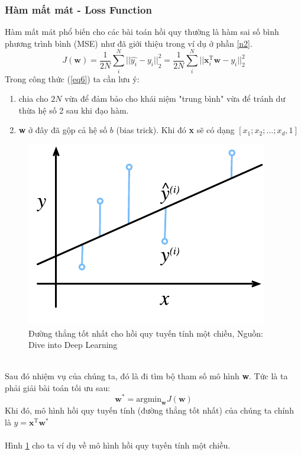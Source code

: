 \documentclass{article}
\begin{document}
\subsubsection*{Hàm mất mát - Loss Function}
Hàm mất mát phổ biến cho các bài toán hồi quy thường là hàm sai số bình phương trình bình (MSE) như đã giới thiệu trong ví dụ ở phần \ref{n2}.
\begin{equation}
    J(\textbf{w}) = \frac{1}{2N}\sum_{i}^{N}{||\hat{y_i}-y_i||}_{2}^{2}=\frac{1}{2N}\sum_{i}^{N}{||\textbf{x}_{i}^{\text{T}}\textbf{w}-y_i||_{2}^{2}}
    \label{eq6}
\end{equation}
Trong công thức (\ref{eq6}) ta cần lưu ý:
\begin{enumerate}
    \item chia cho $2N$ vừa để đảm bảo cho khái niệm "trung bình" vừa để tránh dư thừa hệ số 2 sau khi đạo hàm.
    \item \textbf{w} ở đây đã gộp cả hệ số $b$ (bias trick). Khi đó \textbf{x} sẽ có dạng $[x_1;x_2;\ldots;x_d,1]$
\end{enumerate}
\begin{figure}[ht!]
    \centering
    \includegraphics[width = 0.5\linewidth]{fit-linreg.pdf}
    \caption{Đường thẳng tốt nhất cho hồi quy tuyến tính một chiều, Nguồn: Dive into Deep Learning}
    \label{fig6}
\end{figure}
\phantom{a}\\
Sau đó nhiệm vụ của chúng ta, đó là đi tìm bộ tham số mô hình \textbf{w}. Tức là ta phải giải bài toán tối ưu sau:
\begin{equation}
    \textbf{w}^* = \text{argmin}_{\textbf{w}}J(\textbf{w})
\end{equation}
Khi đó, mô hình hồi quy tuyến tính (đường thẳng tốt nhất) của chúng ta chính là $y = \textbf{x}^{\text{T}}\textbf{w}^{*}$\\\\
Hình \ref{fig6} cho ta ví dụ về mô hình hồi quy tuyến tính một chiều.
\end{document}
